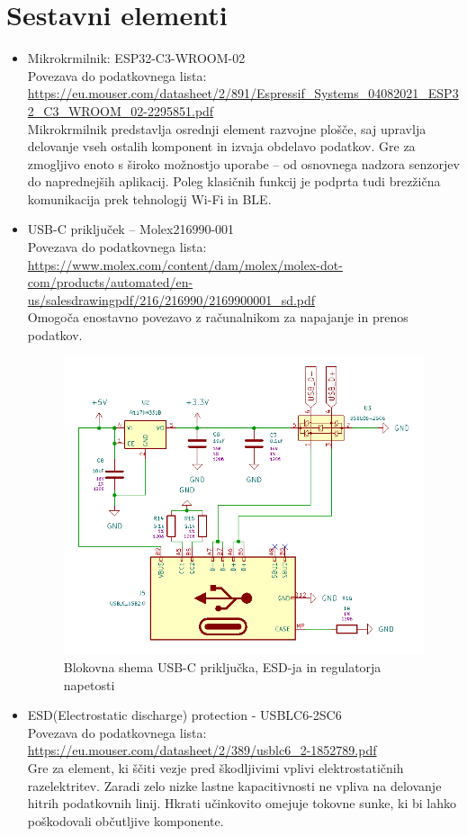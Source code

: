 \section{Sestavni elementi}
\begin{itemize}
    \item Mikrokrmilnik: ESP32-C3-WROOM-02 \\
    Povezava do podatkovnega lista: \url{https://eu.mouser.com/datasheet/2/891/Espressif_Systems_04082021_ESP32_C3_WROOM_02-2295851.pdf} \\
    Mikrokrmilnik predstavlja osrednji element razvojne plošče, saj upravlja delovanje vseh ostalih komponent in izvaja obdelavo podatkov. Gre za zmogljivo enoto s široko možnostjo uporabe – od osnovnega nadzora senzorjev do naprednejših aplikacij. Poleg klasičnih funkcij je podprta tudi brezžična komunikacija prek tehnologij Wi-Fi in BLE.

    \item USB-C priključek – Molex216990-001  \\
    Povezava do podatkovnega lista: \url{https://www.molex.com/content/dam/molex/molex-dot-com/products/automated/en-us/salesdrawingpdf/216/216990/2169900001_sd.pdf} \\
    Omogoča enostavno povezavo z računalnikom za napajanje in prenos podatkov.
    \begin{figure}[H]
        \centering
        \includegraphics[width=0.8\linewidth]{Imgs/blok2.png}
        \caption{Blokovna shema USB-C priključka, ESD-ja in regulatorja napetosti}
        
    \end{figure}

    \item ESD(Electrostatic discharge) protection - USBLC6-2SC6 \\
    Povezava do podatkovnega lista: \url{https://eu.mouser.com/datasheet/2/389/usblc6_2-1852789.pdf} \\
    Gre za element, ki ščiti vezje pred škodljivimi vplivi elektrostatičnih razelektritev. Zaradi zelo nizke lastne kapacitivnosti ne vpliva na delovanje hitrih podatkovnih linij. Hkrati učinkovito omejuje tokovne sunke, ki bi lahko poškodovali občutljive komponente.


\end{itemize}
